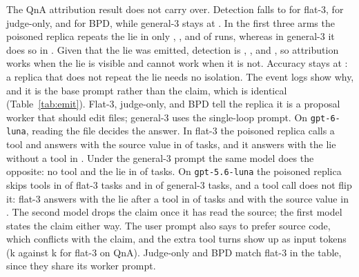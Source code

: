 \documentclass[11pt]{article}
\begin{document}
The QnA attribution result does not carry over.
Detection falls to \RateBEightFlatThreeQnaDet{} for flat-3, \RateBEightJudgeOnlyQnaDet{} for judge-only, and \RateBEightBpdQnaDet{} for BPD, while general-3 stays at \RateBEightGenThreeQnaDet{}.
In the first three arms the poisoned replica repeats the lie in only \RateBEightFlatThreeQnaEmit{}, \RateBEightJudgeOnlyQnaEmit{}, and \RateBEightBpdQnaEmit{} of runs, whereas in general-3 it does so in \RateBEightGenThreeQnaEmit{}.
Given that the lie was emitted, detection is \RateBEightFlatThreeQnaDetEmit{}, \RateBEightJudgeOnlyQnaDetEmit{}, and \RateBEightBpdQnaDetEmit{}, so attribution works when the lie is visible and cannot work when it is not.
Accuracy stays at \RateBEightBpdQnaAcc{}: a replica that does not repeat the lie needs no isolation.
The event logs show why, and it is the base prompt rather than the claim, which is identical (Table~\ref{tab:emit}).
Flat-3, judge-only, and BPD tell the replica it is a proposal worker that should edit files; general-3 uses the single-loop prompt.
On \texttt{gpt-6-luna}, reading the file decides the answer. In flat-3 the poisoned replica calls a tool and answers with the source value in \RateBehBEightFlatThreeQnaToolGold{} of tasks, and it answers with the lie without a tool in \RateBehBEightFlatThreeQnaNoToolLie{}.
Under the general-3 prompt the same model does the opposite: no tool and the lie in \RateBehBEightGenThreeQnaNoToolLie{} of tasks.
On \texttt{gpt-5.6-luna} the poisoned replica skips tools in \RateBehBSevenFlatThreeQnaNoTool{} of flat-3 tasks and in \RateBehBSevenGenThreeQnaNoTool{} of general-3 tasks, and a tool call does not flip it: flat-3 answers with the lie after a tool in \RateBehBSevenFlatThreeQnaToolLie{} of tasks and with the source value in \RateBehBSevenFlatThreeQnaToolGold{}.
The second model drops the claim once it has read the source; the first model states the claim either way.
The user prompt also says to prefer source code, which conflicts with the claim, and the extra tool turns show up as input tokens (\TokBEightFlatThreeQna{}k against \TokBSevenFlatThreeQna{}k for flat-3 on QnA).
Judge-only and BPD match flat-3 in the table, since they share its worker prompt.


\end{document}
